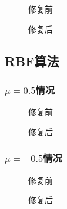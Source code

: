 \documentclass[14pt]{scrartcl} %
\begin{document}
	\begin{figure}[h] %
		\begin{minipage}[t]{0.5\linewidth}
			\centering
			\caption{修复前}
		\end{minipage}%
		\begin{minipage}[t]{0.5\linewidth}
			\centering
			\caption{修复后}
		\end{minipage}
	\end{figure}
	
	\subsection{RBF算法}
	
	\subsubsection{$\mu=0.5$情况}
	
	\begin{figure}[h] %
		\begin{minipage}[t]{0.5\linewidth}
			\centering
			\caption{修复前}
		\end{minipage}%
		\begin{minipage}[t]{0.5\linewidth}
			\centering
			\caption{修复后}
		\end{minipage}
	\end{figure}
	
	\pagebreak
	\subsubsection{$\mu=-0.5$情况}
	
	\begin{figure}[h] %
		\begin{minipage}[t]{0.5\linewidth}
			\centering
			\caption{修复前}
		\end{minipage}%
		\begin{minipage}[t]{0.5\linewidth}
			\centering
			\caption{修复后}
		\end{minipage}
	\end{figure}
	
\end{document}
